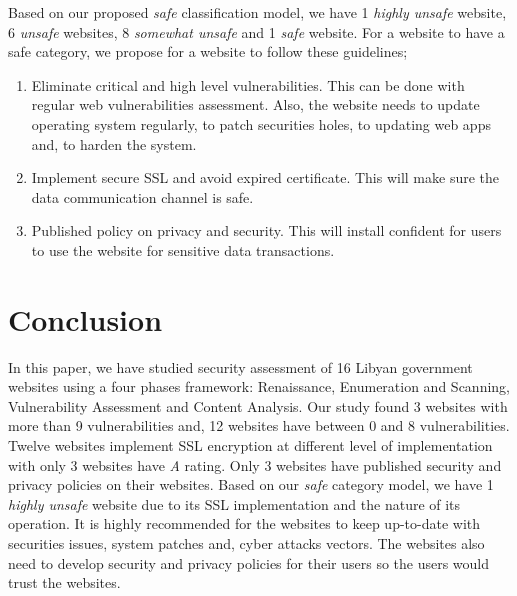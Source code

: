\documentclass[conference,letterpaper]{IEEEtran}
\begin{document}
Based on our proposed \emph{safe} 
classification model, we have 1 \emph{highly 
	unsafe} website, 6 \emph{unsafe} websites, 8 \emph{somewhat
	unsafe} and 1 \emph{safe} website. For a website to have a safe category, we propose for a website to follow these guidelines;
\begin{enumerate}
	\item Eliminate critical and high level vulnerabilities.
	This can be done with regular web vulnerabilities
	assessment. Also, the website needs to update operating
	system regularly, to patch securities holes, to updating
	web apps and, to harden the system.
	\item Implement secure SSL and avoid expired certificate. This will make sure the data communication channel is safe.
	\item Published
	policy on privacy and security. This will install confident for users to use the website for sensitive data transactions.
\end{enumerate} 




  

%





\section{Conclusion}

In this paper, we have studied security assessment of 16 Libyan
government websites using a four phases framework: Renaissance,
Enumeration and Scanning, Vulnerability Assessment and Content
Analysis. Our study found 3 websites with more than 9 vulnerabilities and, 12 websites have between 0 and 8 vulnerabilities. Twelve websites implement SSL
encryption at different level of implementation with only 3 websites
have \emph{A} rating. Only 3 websites have published security and
privacy policies on their websites. Based on our \emph{safe} category model, we have 1 \emph{highly unsafe} website due to its SSL implementation and the nature of
its operation. It is highly recommended for the websites to keep
up-to-date with securities issues, system patches and, cyber attacks
vectors. The websites also need to develop security and privacy policies
for their users so the users would trust the websites.
\end{document}
